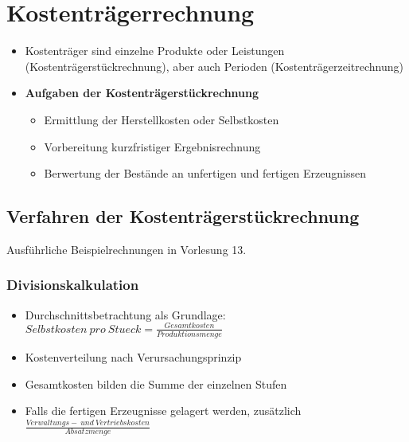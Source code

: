 \section{Kostenträgerrechnung}
\begin{itemize}
	\item Kostenträger sind einzelne Produkte oder Leistungen (Kostenträgerstückrechnung), aber auch Perioden (Kostenträgerzeitrechnung)
	\item \textbf{Aufgaben der Kostenträgerstückrechnung}
	\begin{itemize}
		\item Ermittlung der Herstellkosten oder Selbstkosten
		\item Vorbereitung kurzfristiger Ergebnisrechnung
		\item Berwertung der Bestände an unfertigen und fertigen Erzeugnissen
	\end{itemize}
\end{itemize}


\subsection{Verfahren der Kostenträgerstückrechnung}
Ausführliche Beispielrechnungen in Vorlesung 13.

\subsubsection{Divisionskalkulation}
\begin{itemize}
	\item Durchschnittsbetrachtung als Grundlage: \(Selbstkosten~pro~Stueck=\frac{Gesamtkosten}{Produktionsmenge}\)
	\item Kostenverteilung nach Verursachungsprinzip
	\item Gesamtkosten bilden die Summe der einzelnen Stufen
	\item Falls die fertigen Erzeugnisse gelagert werden, zusätzlich \(\frac{Verwaltungs-~und~Vertriebskosten}{Absatzmenge}\)
\end{itemize}


